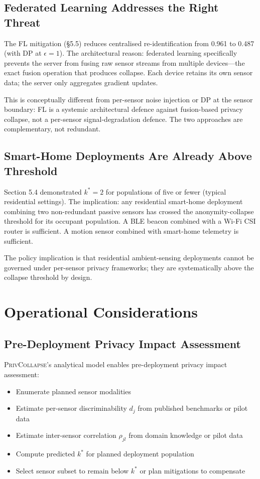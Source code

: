 \documentclass[sigconf,nonacm]{acmart}
\begin{document}
\subsection{Federated Learning Addresses the Right Threat}

The FL mitigation (§5.5) reduces centralised re-identification
from 0.961 to 0.487 (with DP at $\epsilon = 1$). The
architectural reason: federated learning specifically prevents
the server from fusing raw sensor streams from multiple
devices---the exact fusion operation that produces collapse.
Each device retains its own sensor data; the server only
aggregates gradient updates.

This is conceptually different from per-sensor noise injection
or DP at the sensor boundary: FL is a systemic architectural
defence against fusion-based privacy collapse, not a per-sensor
signal-degradation defence. The two approaches are complementary,
not redundant.

\subsection{Smart-Home Deployments Are Already Above Threshold}

Section 5.4 demonstrated $k^* = 2$ for populations of five or
fewer (typical residential settings). The implication: any
residential smart-home deployment combining two non-redundant
passive sensors has crossed the anonymity-collapse threshold for
its occupant population. A BLE beacon combined with a Wi-Fi CSI
router is sufficient. A motion sensor combined with smart-home
telemetry is sufficient.

The policy implication is that residential ambient-sensing
deployments cannot be governed under per-sensor privacy
frameworks; they are systematically above the collapse threshold
by design.

\section{Operational Considerations}

\subsection{Pre-Deployment Privacy Impact Assessment}

\textsc{PrivCollapse}'s analytical model enables pre-deployment
privacy impact assessment:

\begin{itemize}
  \item Enumerate planned sensor modalities
  \item Estimate per-sensor discriminability $d_j$ from published
        benchmarks or pilot data
  \item Estimate inter-sensor correlation $\rho_{jl}$ from
        domain knowledge or pilot data
  \item Compute predicted $k^*$ for planned deployment population
  \item Select sensor subset to remain below $k^*$ or plan
        mitigations to compensate
\end{itemize}
\end{document}
